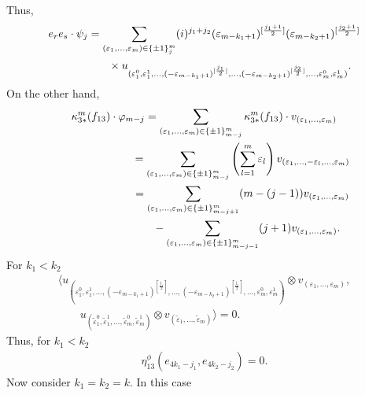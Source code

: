 \documentclass[pdftex]{sigma}
\numberwithin{equation}{section}
\begin{document}
Thus,
\begin{gather*}
 e_re_s\cdot\psi_{j}=
\sum_{(\varepsilon_{1},\dots ,\varepsilon_{m})\in\{\pm
1\}_{j}^{m}}(i)^{j_1+j_2}(\varepsilon_{m-k_1+1})^{[\frac{j_1+1}{2}]}(\varepsilon_{m-k_2+1})^{[\frac{j_2+1}{2}]}\\
\hphantom{e_re_s\cdot\psi_{j}=}{} \times u_{(\varepsilon_{1}^0, \varepsilon_{1}^1 ,\dots, (-\varepsilon_{m-k_1+1})^{[\frac{j_1}{2}]}, \dots,
(-\varepsilon_{m-k_2+1})^{[\frac{j_2}{2}]}, \dots,\varepsilon_{m}^0,\varepsilon_{m}^1)}.
\end{gather*}
On the other hand,
\begin{gather*}
\kappa_{3\ast}^{m}(f_{13})\cdot \varphi_{m-j} = \sum_{(\varepsilon_{1},\dots ,\varepsilon_{m})\in\{\pm1\}_{m-j}^{m}}\kappa_{3\ast}^{m}(f_{13})\cdot v_{(\varepsilon_{1},\dots,\varepsilon_m)}\\
\hphantom{\kappa_{3\ast}^{m}(f_{13})\cdot \varphi_{m-j}}{} =
 \sum_{(\varepsilon_{1},\dots,
\varepsilon_{m})\in\{\pm 1\}_{m-j}^{m}}\left( \sum_{l=1}^{m}\varepsilon_{l}\right)
v_{(\varepsilon_{1},\dots,-\varepsilon_{l},\dots,\varepsilon_m)}\\
\hphantom{\kappa_{3\ast}^{m}(f_{13})\cdot \varphi_{m-j}}{}
= \sum_{(\varepsilon_{1},\dots ,\varepsilon_{m})\in\{\pm
1\}_{m-j+1}^{m}}(m-(j-1))v_{(\varepsilon_{1},\dots,\varepsilon_m)}\\
\hphantom{\kappa_{3\ast}^{m}(f_{13})\cdot \varphi_{m-j}=}{}
-\sum_{(\varepsilon_{1},\dots, \varepsilon_{m})\in\{\pm 1\}_{m-j-1}^{m}}(j+1)v_{(\varepsilon_{1},\dots,\varepsilon_m)}.
\end{gather*}
For $k_1<k_2$
\begin{gather*}
\big\langle u_{(\varepsilon_{1}^0, \varepsilon_{1}^1, \dots, (-\varepsilon_{m-k_1+1})^{[\frac{j_1}{2}]} ,\dots,
(-\varepsilon_{m-k_2+1})^{[\frac{j_2}{2}]}, \dots, \varepsilon_{m}^0,\varepsilon_{m}^1)} \otimes v_{(\varepsilon_{1},\dots,\varepsilon_m)},\\
\qquad{} u_{(\tilde{\varepsilon}_{1}^0, \tilde{\varepsilon}_{1}^1, \dots ,\tilde{\varepsilon}_{m}^0,\tilde{\varepsilon}_{m}^1)} \otimes
v_{(\tilde{\varepsilon}_{1},\dots,\tilde{\varepsilon}_m)}\big\rangle =0.
\end{gather*}
Thus, for $k_1<k_2$
\begin{gather*}\eta_{13}^\phi(e_{4k_1-j_1},e_{4k_2-j_2})=0.\end{gather*}
Now consider $k_1=k_2=k$. In this case
\end{document}
